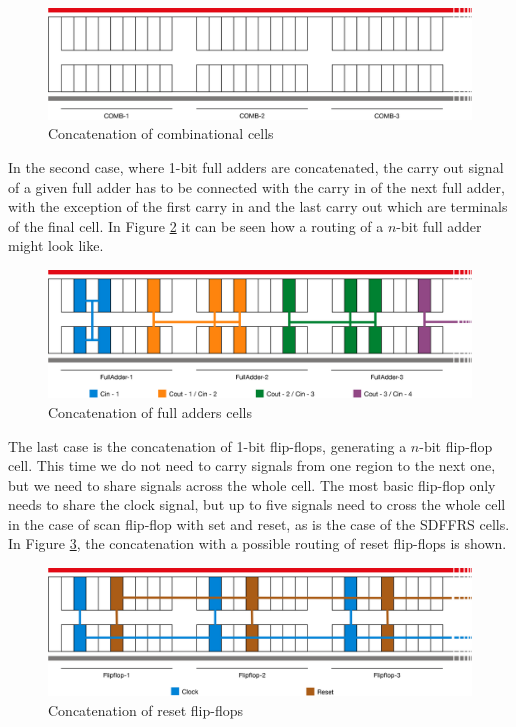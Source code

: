 \begin{figure}[h!]
  \centering
  \includegraphics[scale=0.5]{img/results/NCombinacionals.png}
  \caption{Concatenation of combinational cells}
  \label{fig:NCombinacionals}
\end{figure} 

In the second case, where 1-bit full adders are concatenated, the carry out signal of a given full adder has to be connected with the carry in of the next full adder, with the exception of the first carry in and the last carry out which are terminals of the final cell. In Figure \ref{fig:FA_X1_N} it can be seen how a routing of a $n$-bit full adder might look like. \\

\begin{figure}[h!]
  \centering
  \includegraphics[scale=0.5]{img/results/FA_X1_N.png}
  \caption{Concatenation of full adders cells}
  \label{fig:FA_X1_N}
\end{figure} 

The last case is the concatenation of 1-bit flip-flops, generating a $n$-bit flip-flop cell. This time we do not need to carry signals from one region to the next one, but we need to share signals across the whole cell. The most basic flip-flop only needs to share the clock signal, but up to five signals need to cross the whole cell in the case of scan flip-flop with set and reset, as is the case of the SDFFRS cells. In Figure \ref{fig:Flipflop_N}, the concatenation with a possible routing of reset flip-flops is shown. \\
  	
\begin{figure}[h!]
  \centering
  \includegraphics[scale=0.5]{img/results/Flipflop_N.png}
  \caption{Concatenation of reset flip-flops}
  \label{fig:Flipflop_N}
\end{figure} 
  	

